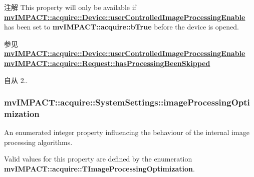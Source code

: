 \begin{DoxyNote}{注解}
This property will only be available if {\bfseries \hyperlink{classmv_i_m_p_a_c_t_1_1acquire_1_1_device_a4d5db996353c3b9ada5f6a15fb19f9eb}{mv\+I\+M\+P\+A\+C\+T\+::acquire\+::\+Device\+::user\+Controlled\+Image\+Processing\+Enable}} has been set to {\bfseries mv\+I\+M\+P\+A\+C\+T\+::acquire\+::b\+True} before the device is opened.
\end{DoxyNote}
\begin{DoxySeeAlso}{参见}
{\bfseries \hyperlink{classmv_i_m_p_a_c_t_1_1acquire_1_1_device_a4d5db996353c3b9ada5f6a15fb19f9eb}{mv\+I\+M\+P\+A\+C\+T\+::acquire\+::\+Device\+::user\+Controlled\+Image\+Processing\+Enable}} ~\newline
{\bfseries \hyperlink{classmv_i_m_p_a_c_t_1_1acquire_1_1_request_a523d15ab27c20de51f0c5ffd41ff3834}{mv\+I\+M\+P\+A\+C\+T\+::acquire\+::\+Request\+::has\+Processing\+Been\+Skipped}} 
\end{DoxySeeAlso}
\begin{DoxySince}{自从}
2.. 
\end{DoxySince}
\hypertarget{classmv_i_m_p_a_c_t_1_1acquire_1_1_system_settings_afa429bb0a75e996fba2493c320003d7f}{
\subsubsection[{image\+Processing\+Optimization}]{ mv\+I\+M\+P\+A\+C\+T\+::acquire\+::\+System\+Settings\+::image\+Processing\+Optimization}}\label{classmv_i_m_p_a_c_t_1_1acquire_1_1_system_settings_afa429bb0a75e996fba2493c320003d7f}


An enumerated integer property influencing the behaviour of the internal image processing algorithms. 

Valid values for this property are defined by the enumeration {\bfseries mv\+I\+M\+P\+A\+C\+T\+::acquire\+::\+T\+Image\+Processing\+Optimization}.


